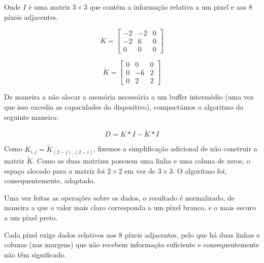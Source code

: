 \documentclass[a4paper,12pt]{article}
\begin{document}
Onde $I$ é uma matriz $3 \times 3$ que contém a informação relativa a um pixel e aos 8 píxeis adjacentes.

\[ K =
\begin{bmatrix}
-2 & -2 & 0\\
-2 & 6 & 0\\
0 & 0 & 0
\end{bmatrix}
\]

\[\widetilde{K} = 
\begin{bmatrix}
0&0&0\\
0&-6&2\\
0&2&2
\end{bmatrix}
\]

De maneira a não alocar a memória necessária a um buffer intermédio (uma vez que isso excedia as capacidades do dispositivo), compactámos o algoritmo da seguinte maneira:

\[
D = K \ast I - \widetilde{K} \ast I
\]

Como $K_{i,j} = \widetilde{K}_{(2-j),(2-i)}$, fizemos a simplificação adicional de não construir a matriz $\widetilde{K}$. Como as duas matrizes possuem uma linha e uma coluna de zeros, o espaço alocado para a matriz foi $2\times2$ em vez de $3\times3$. O algoritmo foi, consequentemente, adaptado.



Uma vez feitas as operações sobre os dados, o resultado é normalizado, de maneira a que o valor mais claro corresponda a um píxel branco, e o mais escuro a um píxel preto.

Cada píxel exige dados relativos aos 8 píxeis adjacentes, pelo que há duas linhas e colunas (nas margens) que não recebem informação suficiente e consequentemente não têm significado.
\end{document}
